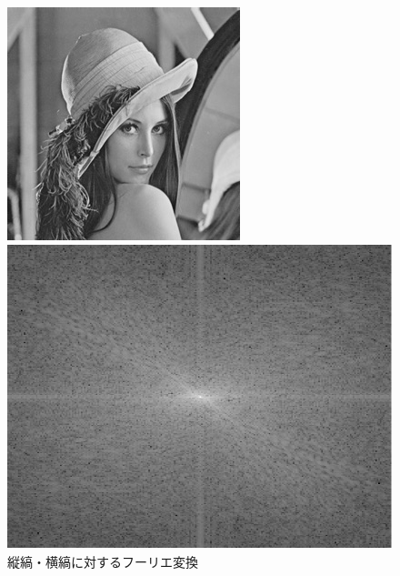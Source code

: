 \begin{figure}[H]
\begin{tabularx}{\textwidth}{p{}CCC}
        \vspace{.5em}                                                                                                     \\
        \hline
    \end{tabularx}
    \caption{縦縞・横縞に対するフーリエ変換}
    \nextfloat
    \vspace{.5em}
    \begin{minipage}[b]{.15\textwidth}
        \centering
        \includegraphics[keepaspectratio,width=\textwidth]{../../LENNA.jpeg}
    \end{minipage}
    \begin{minipage}[b]{.15\textwidth}
        \centering
        \includegraphics[keepaspectratio,width=\textwidth]{../../Figures/08_42_fft.pdf}

\end{minipage}
\end{figure}
